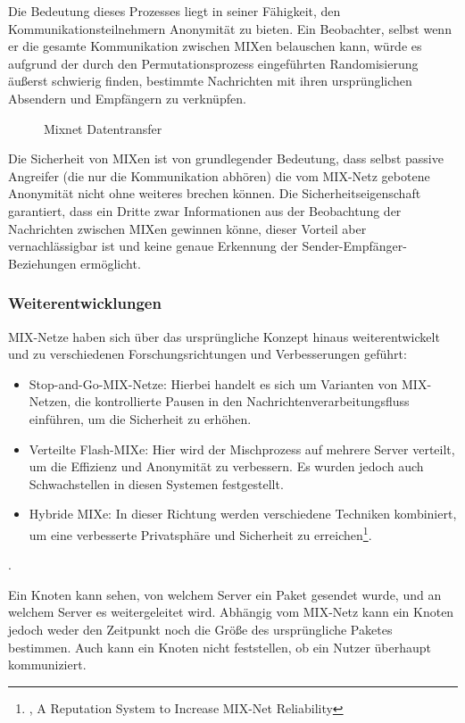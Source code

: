 Die Bedeutung dieses Prozesses liegt in seiner Fähigkeit, den Kommunikationsteilnehmern Anonymität zu bieten. Ein Beobachter, selbst wenn er die gesamte Kommunikation zwischen MIXen belauschen kann, würde es aufgrund der durch den Permutationsprozess eingeführten Randomisierung äußerst schwierig finden, bestimmte Nachrichten mit ihren ursprünglichen Absendern und Empfängern zu verknüpfen.

\begin{figure}[h!]
    \centering
    
    \caption{Mixnet Datentransfer}
    \label{imgs:mixnet_transfer}
\end{figure}

Die Sicherheit von MIXen ist von grundlegender Bedeutung, dass selbst passive Angreifer (die nur die Kommunikation abhören) die vom MIX-Netz gebotene Anonymität nicht ohne weiteres brechen können. Die Sicherheitseigenschaft garantiert, dass ein Dritte zwar Informationen aus der Beobachtung der Nachrichten zwischen MIXen gewinnen könne, dieser Vorteil aber vernachlässigbar ist und keine genaue Erkennung der Sender-Empfänger-Beziehungen ermöglicht.

\subsubsection{Weiterentwicklungen}
\label{chap:mixnet_enhancements}

MIX-Netze haben sich über das ursprüngliche Konzept hinaus weiterentwickelt und zu verschiedenen Forschungsrichtungen und Verbesserungen geführt:

\begin{itemize}
    \item Stop-and-Go-MIX-Netze: Hierbei handelt es sich um Varianten von MIX-Netzen, die kontrollierte Pausen in den Nachrichtenverarbeitungsfluss einführen, um die Sicherheit zu erhöhen.
    \item Verteilte \glqq Flash-MIXe\grqq: Hier wird der Mischprozess auf mehrere Server verteilt, um die Effizienz und Anonymität zu verbessern. Es wurden jedoch auch Schwachstellen in diesen Systemen festgestellt.
    \item Hybride MIXe: In dieser Richtung werden verschiedene Techniken kombiniert, um eine verbesserte Privatsphäre und Sicherheit zu erreichen\footnote{\cite{MIXNetReliability}, A Reputation System to Increase MIX-Net Reliability}.
\end{itemize}.

Ein Knoten kann sehen, von welchem Server ein Paket gesendet wurde, und an welchem Server es weitergeleitet wird. Abhängig vom MIX-Netz kann ein Knoten jedoch weder den Zeitpunkt noch die Größe des ursprüngliche Paketes bestimmen. Auch kann ein Knoten nicht feststellen, ob ein Nutzer überhaupt kommuniziert.


